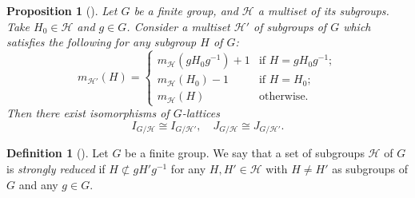 \documentclass[12pt]{amsart}
\theoremstyle{plain}
\newtheorem{cor}[thm]{Corollary}
\newtheorem{prop}[thm]{Proposition}
\theoremstyle{definition}
\newtheorem{dfn}[thm]{Definition}
\numberwithin{thm}{section}
\numberwithin{equation}{section}
\newcommand{\Z}{\mathbb{Z}}
\newcommand{\cH}{\mathcal{H}}
\DeclareMathOperator{\set}{set}
\begin{document}

\begin{prop}[{\cite[Proposition 3.20]{Hasegawa}}]\label{prop:conj}
Let $G$ be a finite group, and $\cH$ a multiset of its subgroups. Take $H_{0}\in \cH$ and $g\in G$. Consider a multiset $\cH'$ of subgroups of $G$ which satisfies the following for any subgroup $H$ of $G$: 
\begin{equation*}
m_{\cH'}(H)=
\begin{cases}
m_{\cH}(gH_{0}g^{-1})+1&\text{if }H=gH_{0}g^{-1}; \\
m_{\cH}(H_{0})-1&\text{if }H=H_{0};\\
m_{\cH}(H)&\text{otherwise}. 
\end{cases}
\end{equation*}
Then there exist isomorphisms of $G$-lattices
\begin{equation*}
    I_{G/\cH}\cong I_{G/\cH'},\quad J_{G/\cH}\cong J_{G/\cH'}. 
\end{equation*}
\end{prop}

\begin{dfn}[{\cite[Definition 3.15]{Hasegawa}}]
Let $G$ be a finite group. We say that a set of subgroups $\cH$ of $G$ is \emph{strongly reduced} if $H \not\subset gH'g^{-1}$ for any $H,H'\in \cH$ with $H\neq H'$ as subgroups of $G$ and any $g\in G$. 
\end{dfn}
\end{document}
